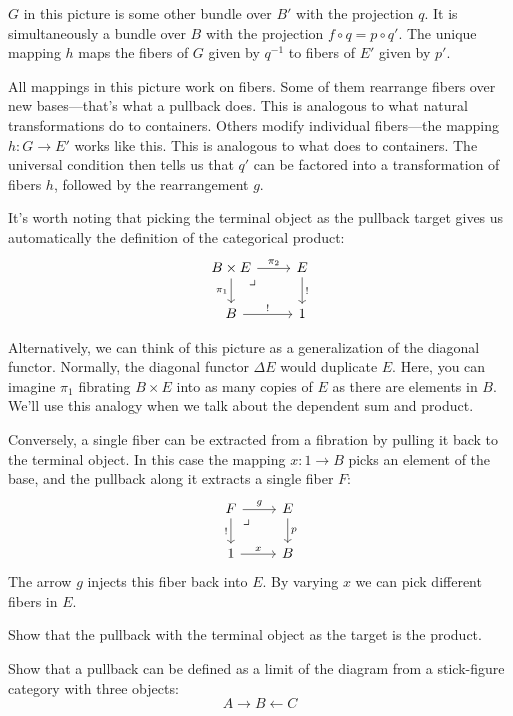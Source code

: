 \documentclass[DaoFP]{subfiles}
\begin{document}
$G$ in this picture is some other bundle over $B'$ with the projection $q$. It is simultaneously a bundle over $B$ with the projection $f \circ q = p \circ q'$. The unique mapping $h$ maps the fibers of $G$ given by $q^{-1}$ to fibers of $E'$ given by $p'$. 

All mappings in this picture work on fibers. Some of them rearrange fibers over new bases---that's what a pullback does. This is analogous to what natural transformations do to containers. Others modify individual fibers---the mapping $h \colon G \to E'$ works like this. This is analogous to what  does to containers. The universal condition then tells us that $q'$ can be factored into a transformation of fibers $h$, followed by the rearrangement $g$.

It's worth noting that picking the terminal object as the pullback target gives us automatically the definition of the categorical product:
\[
 \begin{tikzcd}
 B \times E
 \arrow[d, "\pi_1"']
 \arrow[r, "\pi_2"]
\arrow[dr, phantom,  , very near start, "\lrcorner"]
 & E
 \arrow[d, "!"]
 \\
 B
 \arrow[r, "!"]
 &
 1
  \end{tikzcd}
\]

Alternatively, we can think of this picture as a generalization of the diagonal functor. Normally, the diagonal functor $\Delta E$ would duplicate $E$. Here, you can imagine $\pi_1$ fibrating $B\times E$ into as many copies of $E$ as there are elements in $B$. We'll use this analogy when we talk about the dependent sum and product.

Conversely, a single fiber can be extracted from a fibration by pulling it back to the terminal object. In this case the mapping $x \colon 1 \to B$ picks an element of the base, and the pullback along it extracts a single fiber $F$:
\[
 \begin{tikzcd}
 F
 \arrow[d, "!"']
 \arrow[r, "g"]
\arrow[dr, phantom,  , very near start, "\lrcorner"]
 & E
 \arrow[d, "p"]
 \\
 1
 \arrow[r, "x"]
 &
 B
  \end{tikzcd}
\]
The arrow $g$ injects this fiber back into $E$. By varying $x$ we can pick different fibers in $E$.

\begin{exercise}
Show that the pullback with the terminal object as the target is the product.
\end{exercise}
\begin{exercise}
Show that a pullback can be defined as a limit of the diagram from a stick-figure category with three objects:
\[ A \rightarrow B \leftarrow C \]
\end{exercise}
\end{document}
